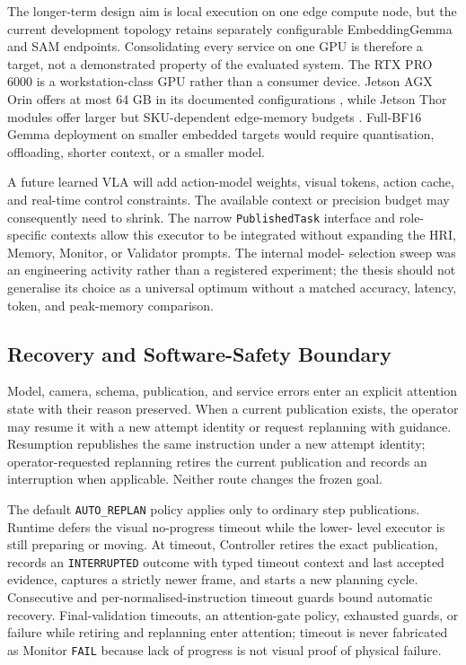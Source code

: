\documentclass{article}
\begin{document}
The longer-term design aim is local execution on one edge compute node, but
the current development topology retains separately configurable
EmbeddingGemma and SAM endpoints. Consolidating every service on one GPU is
therefore a target, not a demonstrated property of the evaluated system. The
RTX PRO 6000 is a workstation-class GPU rather than a consumer device. Jetson
AGX Orin offers at most 64 GB in its documented configurations
\parencite{nvidia2026jetsonorin}, while Jetson Thor modules offer larger but
SKU-dependent edge-memory budgets \parencite{nvidia2026jetsonthor}. Full-BF16
Gemma deployment on smaller embedded targets would require quantisation,
offloading, shorter context, or a smaller model.

A future learned VLA will add action-model weights, visual tokens, action cache,
and real-time control constraints. The available context or precision budget
may consequently need to shrink. The narrow \texttt{PublishedTask} interface
and role-specific contexts allow this executor to be integrated without
expanding the HRI, Memory, Monitor, or Validator prompts. The internal model-
selection sweep was an engineering activity rather than a registered
experiment; the thesis should not generalise its choice as a universal optimum
without a matched accuracy, latency, token, and peak-memory comparison.

\subsection{Recovery and Software-Safety Boundary}
\label{subsec:methodology-recovery}

Model, camera, schema, publication, and service errors enter an explicit
attention state with their reason preserved. When a current publication exists,
the operator may resume it with a new attempt identity or request replanning
with guidance. Resumption republishes the same instruction under a new attempt
identity; operator-requested replanning retires the current publication and
records an interruption when applicable. Neither route changes the frozen goal.

The default \texttt{AUTO\_REPLAN} policy applies only to ordinary step
publications. Runtime defers the visual no-progress timeout while the lower-
level executor is still preparing or moving. At timeout, Controller retires the
exact publication, records an \texttt{INTERRUPTED} outcome with typed timeout
context and last accepted evidence, captures a strictly newer frame, and starts
a new planning cycle. Consecutive and per-normalised-instruction timeout guards
bound automatic recovery. Final-validation timeouts, an attention-gate policy,
exhausted guards, or failure while retiring and replanning enter attention;
timeout is never fabricated as Monitor \texttt{FAIL} because lack of progress
is not visual proof of physical failure.
\end{document}

